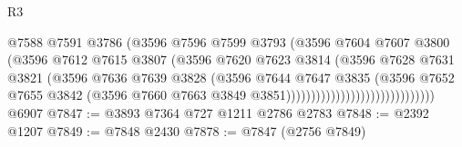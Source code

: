 \begin{lexlean}{R3}
\begin{coremodule}
                                              @7588
                                              @7591
                                              @3786
                                              (@3596
                                                @7596
                                                @7599
                                                @3793
                                                (@3596
                                                  @7604
                                                  @7607
                                                  @3800
                                                  (@3596
                                                    @7612
                                                    @7615
                                                    @3807
                                                    (@3596
                                                      @7620
                                                      @7623
                                                      @3814
                                                      (@3596
                                                        @7628
                                                        @7631
                                                        @3821
                                                        (@3596
                                                          @7636
                                                          @7639
                                                          @3828
                                                          (@3596
                                                            @7644
                                                            @7647
                                                            @3835
                                                            (@3596
                                                              @7652
                                                              @7655
                                                              @3842
                                                              (@3596
                                                                @7660
                                                                @7663
                                                                @3849
                                                                @3851))))))))))))))))))))))))))))))
    @6907
@7847 := @3893 @7364 @727 @1211 @2786 @2783
@7848 := @2392 @1207
@7849 := @7848 @2430
@7878 := @7847
    (@2756 @7849)

\end{coremodule}
\end{lexlean}

